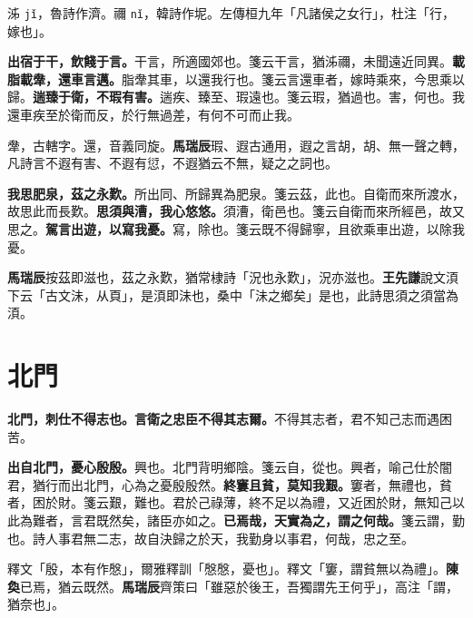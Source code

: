 \begin{quoting}泲 \texttt{jǐ}，魯詩作濟。禰 \texttt{nǐ}，韓詩作坭。左傳桓九年「凡諸侯之女行」，杜注「行，嫁也」。\end{quoting}

\textbf{出宿于干，飲餞于言。}{\footnotesize 干言，所適國郊也。箋云干言，猶泲禰，未聞遠近同異。}\textbf{載脂載舝，還車言邁。}{\footnotesize 脂舝其車，以還我行也。箋云言還車者，嫁時乘來，今思乘以歸。}\textbf{遄臻于衛，不瑕有害。}{\footnotesize 遄疾、臻至、瑕遠也。箋云瑕，猶過也。害，何也。我還車疾至於衛而反，於行無過差，有何不可而止我。}

\begin{quoting}舝，古轄字。還，音義同旋。\textbf{馬瑞辰}瑕、遐古通用，遐之言胡，胡、無一聲之轉，凡詩言不遐有害、不遐有愆，不遐猶云不無，疑之之詞也。\end{quoting}

\textbf{我思肥泉，茲之永歎。}{\footnotesize 所出同、所歸異為肥泉。箋云茲，此也。自衛而來所渡水，故思此而長歎。}\textbf{思須與漕，我心悠悠。}{\footnotesize 須漕，衛邑也。箋云自衛而來所經邑，故又思之。}\textbf{駕言出遊，以寫我憂。}{\footnotesize 寫，除也。箋云既不得歸寧，且欲乘車出遊，以除我憂。}

\begin{quoting}\textbf{馬瑞辰}按茲即滋也，茲之永歎，猶常棣詩「況也永歎」，況亦滋也。\textbf{王先謙}說文湏下云「古文沬，从頁」，是湏即沬也，桑中「沬之鄉矣」是也，此詩思須之須當為湏。\end{quoting}

\section{北門}


\textbf{北門，刺仕不得志也。言衛之忠臣不得其志爾。}{\footnotesize 不得其志者，君不知己志而遇困苦。}

\textbf{出自北門，憂心殷殷。}{\footnotesize 興也。北門背明鄉陰。箋云自，從也。興者，喻己仕於闇君，猶行而出北門，心為之憂殷殷然。}\textbf{終窶且貧，莫知我艱。}{\footnotesize 窶者，無禮也，貧者，困於財。箋云艱，難也。君於己祿薄，終不足以為禮，又近困於財，無知己以此為難者，言君既然矣，諸臣亦如之。}\textbf{已焉哉，天實為之，謂之何哉。}{\footnotesize 箋云謂，勤也。詩人事君無二志，故自決歸之於天，我勤身以事君，何哉，忠之至。}

\begin{quoting}釋文「殷，本有作慇」，爾雅釋訓「慇慇，憂也」。釋文「窶，謂貧無以為禮」。\textbf{陳奐}已焉，猶云既然。\textbf{馬瑞辰}齊策曰「雖惡於後王，吾獨謂先王何乎」，高注「謂，猶奈也」。\end{quoting}

